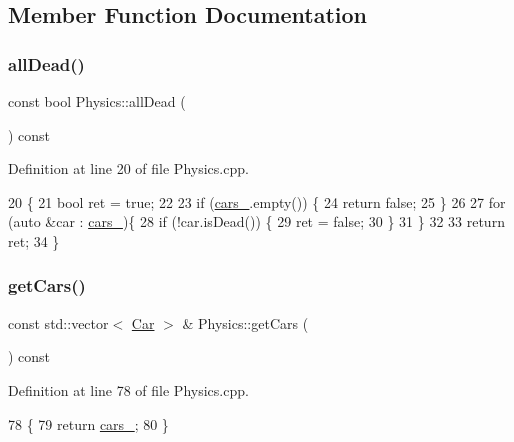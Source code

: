 \subsection{Member Function Documentation}
\mbox{\label{classPhysics_a44933e5f70128b1ff6d0ccb6dd7b3628}} 
\subsubsection{\texorpdfstring{all\+Dead()}{allDead()}}
{\footnotesize\ttfamily const bool Physics\+::all\+Dead (\begin{DoxyParamCaption}{ }\end{DoxyParamCaption}) const}



Definition at line 20 of file Physics.\+cpp.


\begin{DoxyCode}
20                                   \{
21     \textcolor{keywordtype}{bool} ret = \textcolor{keyword}{true};
22 
23     \textcolor{keywordflow}{if} (\hyperlink{classPhysics_ad798f52a18a2e5975f349b1fd95ceefc}{cars\_}.empty()) \{
24         \textcolor{keywordflow}{return} \textcolor{keyword}{false};
25     \}
26 
27     \textcolor{keywordflow}{for} (\textcolor{keyword}{auto} &car : \hyperlink{classPhysics_ad798f52a18a2e5975f349b1fd95ceefc}{cars\_})\{
28         \textcolor{keywordflow}{if} (!car.isDead()) \{
29           ret = \textcolor{keyword}{false};
30         \}
31     \}
32 
33     \textcolor{keywordflow}{return} ret;
34 \}
\end{DoxyCode}
\mbox{\label{classPhysics_a1a235bab70736238746e3028799680e5}} 
\subsubsection{\texorpdfstring{get\+Cars()}{getCars()}}
{\footnotesize\ttfamily const std\+::vector$<$ \hyperlink{classCar}{Car} $>$ \& Physics\+::get\+Cars (\begin{DoxyParamCaption}{ }\end{DoxyParamCaption}) const}



Definition at line 78 of file Physics.\+cpp.


\begin{DoxyCode}
78                                              \{
79     \textcolor{keywordflow}{return} \hyperlink{classPhysics_ad798f52a18a2e5975f349b1fd95ceefc}{cars\_};
80 \}
\end{DoxyCode}
\mbox{\label{classPhysics_a185e8476eebb2de5d8b26e52f14d864b}} 
